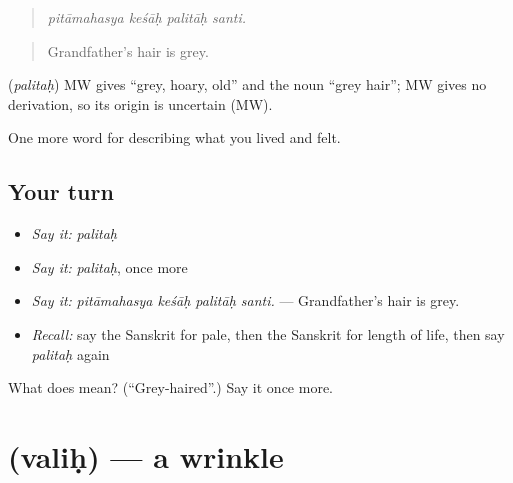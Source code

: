 \begin{quote}
   
\end{quote}

\begin{quote}
\emph{pitāmahasya keśāḥ palitāḥ santi.}
\end{quote}

\begin{quote}
Grandfather's hair is grey.
\end{quote}

\begin{cousinweb}
\textbf{} (\emph{palitaḥ}) MW gives \textquotedblleft{}grey, hoary, old\textquotedblright{} and the noun \textquotedblleft{}grey hair\textquotedblright{}; MW gives no derivation, so its origin is uncertain (MW).
\end{cousinweb}

\begin{grammarlens}[title={What you've built}]
One more word for describing what you lived and felt.
\end{grammarlens}

\subsection*{Your turn}
\begin{itemize}
\raggedright
  \item \emph{Say it:} \emph{palitaḥ}
  \item \emph{Say it:} \emph{palitaḥ}, once more
  \item \emph{Say it:} \emph{pitāmahasya keśāḥ palitāḥ santi.} — Grandfather's hair is grey.
  \item \emph{Recall:} say the Sanskrit for pale, then the Sanskrit for length of life, then say \emph{palitaḥ} again
\end{itemize}

\begin{tcolorbox}[breakable,colback=teal!4,colframe=teal!35!black,title={Before you move on}]
What does  mean? (\textquotedblleft{}Grey-haired\textquotedblright{}.) Say it once more.
\end{tcolorbox}
\section[\texorpdfstring{\sk{वलिः} (valiḥ)}{वलिः (valiḥ)}]{ (valiḥ) — a wrinkle}

\label{lesson:SA-C490-valih}



